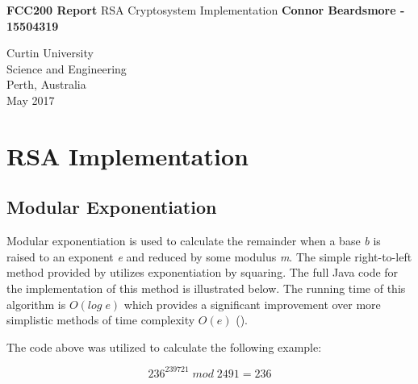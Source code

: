 \documentclass[]{article}
\begin{document}



\begin{titlepage}
	\begin{center}
		\vspace*{1cm}
		\LARGE\textbf{FCC200 Report}
		\break
		RSA Cryptosystem Implementation
		\vspace{1cm}
		\break
		\Large\textbf{Connor Beardsmore - 15504319} 
		\vspace{15cm}

		\normalsize
		Curtin University \\
		Science and Engineering \\
		Perth, Australia \\
	    May 2017
	    
	\end{center}
\end{titlepage}

\vspace*{-0.8cm}
\section*{\hfil RSA Implementation\hfil}

\subsection*{Modular Exponentiation}
\noindent
Modular exponentiation is used to calculate the remainder when a base \textit{b} is raised to an exponent \textit{e} and reduced by some modulus \textit{m}. The simple right-to-left method provided by \cite{alttext} utilizes exponentiation by squaring. The full Java code for the implementation of this method is illustrated below. The running time of this algorithm is $O(log\;e)$ which provides a significant improvement over more simplistic methods of time complexity $O(e)$ (\cite{maintext}).

\vspace{0.2cm}
{}

\noindent
The code above was utilized to calculate the following example:

$$236^{239721}\;mod\;2491=236$$
\end{document}
